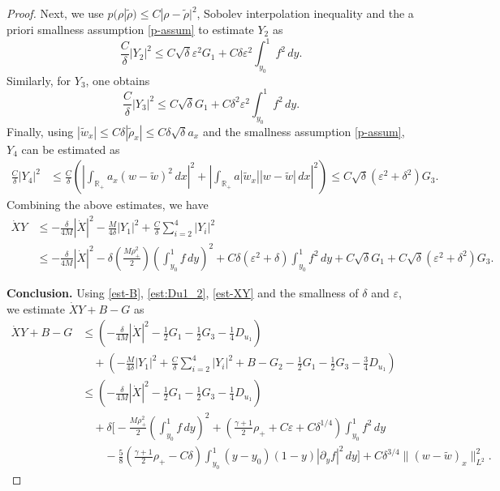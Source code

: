 \documentclass[11pt,reqno]{amsart}
\numberwithin{equation}{section} %
\newcommand{\R}{\mathbb{R}}
\newcommand{\e}{\varepsilon}
\newcommand{\pa}{\partial}
\begin{document}
\begin{proof}
Next, we use $p(\rho|\tilde{\rho})\le C|\rho-\tilde{\rho}|^2$, Sobolev interpolation inequality and the a priori smallness assumption \eqref{p-assum} to estimate $Y_2$ as
\begin{equation*}
\frac{C}{\delta}|Y_2|^2 \le C\sqrt{\delta} \varepsilon^2 G_1 + C\delta \varepsilon^2\int_{y_0}^1 f^2 \, dy.
\end{equation*}
Similarly, for $Y_3$, one obtains
\begin{equation*}
\frac{C}{\delta}|Y_3|^2 \le C\sqrt{\delta} G_1 + C\delta^2\varepsilon^2\int_{y_0}^1 f^2 \, dy.
\end{equation*}
Finally, using $|\tilde{w}_x| \le C \delta |\tilde{\rho}_x| \le C \delta \sqrt{\delta} a_x$ and the smallness assumption \eqref{p-assum}, $Y_4$ can be estimated as 
\begin{align*}
    \frac{C}{\delta} |Y_4|^2 &\le \frac{C}{\delta} \left(\left| \int_{\R_+} a_x  (w-\tilde{w})^2 \, dx\right|^2  + \left|\int_{\R_+} a |\tilde{w}_x| |w-\tilde{w}|\, dx \right|^2\right) \le C \sqrt{\delta} (\varepsilon^2 + \delta^2) G_3.
\end{align*}
Combining the above estimates, we have
\begin{equation} \label{est-XY}
    \begin{aligned}
       \dot{X}Y&\le -\frac{\delta}{4M}|\dot{X}|^2-\frac{M}{4\delta}|Y_1|^2+\frac{C}{\delta} \sum_{i=2}^4 |Y_i|^2 \\
       &\le -\frac{\delta}{4M}|\dot{X}|^2-\delta\left(\frac{M\rho_+^2}{2}\right)\left(\int_{y_0}^1 f \, dy\right)^2 + C \delta(\varepsilon^2+\delta) \int_{y_0}^1 f^2 \, dy + C \sqrt{\delta} G_1 + C \sqrt{\delta} (\varepsilon^2 + \delta^2) G_3.
    \end{aligned}
\end{equation}

\vspace{2mm}
\noindent \textbf{Conclusion.}
Using \eqref{est-B}, \eqref{est:Du1_2}, \eqref{est-XY} and the smallness of $\delta$ and $\e$, we estimate $\dot{X}Y+B-G$ as
\begin{align*}
    \dot{X}Y + B - G &\le \left( -\frac{\delta}{4M}|\dot{X}|^2 - \frac{1}{2}G_1 - \frac{1}{2}G_3 - \frac{1}{4}D_{u_1} \right) \\
    &\quad + \left( -\frac{M}{4\delta}|Y_1|^2 + \frac{C}{\delta} \sum_{i=2}^4 |Y_i|^2 + B  - G_2 - \frac{1}{2}G_1 - \frac{1}{2}G_3 - \frac{3}{4}D_{u_1} \right)\\
    &\le \left( -\frac{\delta}{4M}|\dot{X}|^2 - \frac{1}{2}G_1 - \frac{1}{2}G_3 - \frac{1}{4}D_{u_1} \right)\\
    &\quad +\delta\Bigg[-\frac{M\rho_+^2}{2} \left(\int_{y_0}^1 f \, dy\right)^2  +\left(\frac{\gamma+1}{2}\rho_++C\e+C\delta^{1/4}\right)\int_{y_0}^1f^2\,dy \\
    &\qquad -\frac{5}{8}\left(\frac{\gamma+1}{2}\rho_+-C\delta\right)\int_{y_0}^1(y-y_0)(1-y)|\pa_yf|^2\,dy \Bigg] +C\delta^{3/4}\|(w-\tilde{w})_x\|_{L^2}^2.
\end{align*}


\end{proof}
\end{document}
